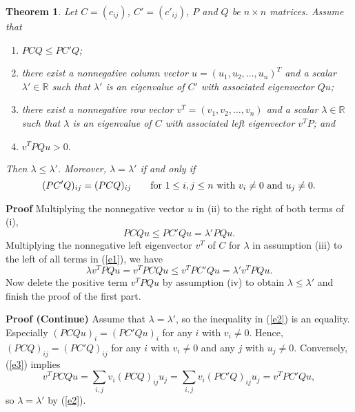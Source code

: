 \documentclass{article}
\theoremstyle{plain}
\newtheorem{thm}{Theorem}[section]
\theoremstyle{definition}
\begin{document}
\begin{thm}
 Let $C=(c_{ij})$, $C'=(c'_{ij})$, $P$ and $Q$ be  $n\times n$ matrices.
Assume that
\begin{enumerate}
\item[(i)]    $PCQ\leq PC'Q$;
\item[(ii)]  there exist a nonnegative column vector $u=(u_1, u_2, \ldots, u_n)^T$  and a scalar $\lambda'\in \mathbb{R}$ such that $\lambda'$ is an eigenvalue of $C'$ with associated eigenvector $Qu$;
\item[(iii)] there exist a nonnegative row vector $v^T=(v_1, v_2, \ldots, v_n)$  and a scalar $\lambda\in \mathbb{R}$
such that $\lambda$ is an eigenvalue of $C$ with associated  left eigenvector $v^TP$; and
\item[(iv)] $v^TPQu>0.$
\end{enumerate}
 Then $\lambda\leq \lambda'$.
    Moreover, $\lambda=\lambda'$ 
if and only if
    \begin{equation*}
        \label{e3}
(PC'Q)_{ij}=(PCQ)_{ij}\qquad \hbox{for~}1\leq i, j\leq n \hbox{~with~} v_i\ne 0 \hbox{~and~} u_j\ne 0.
\end{equation*}
\end{thm}


{\bf Proof}
            Multiplying the nonnegative vector $u$ in (ii) to the right of both terms of  (i),
        \begin{equation}
            \label{e1}
            PCQu\leq PC'Qu=\lambda'PQu.
        \end{equation}
        Multiplying the nonnegative left eigenvector $v^T$ of $C$ for $\lambda$ in assumption (iii) to the left of all terms  in (\ref{e1}), we have
        \begin{equation}
            \label{e2}
            \lambda v^TPQu=v^TPCQu\leq v^TPC'Qu=\lambda' v^TPQu.
        \end{equation}
        Now delete the positive term $v^TPQu$ by assumption (iv) to obtain $\lambda\leq \lambda'$ and finish the proof of the first part.


{\bf Proof (Continue)}
        Assume that $\lambda=\lambda'$, so the inequality in (\ref{e2}) is an equality.  Especially $(PCQu)_i=(PC'Qu)_i$ for any $i$ with $v_i\not=0.$ Hence, $(PCQ)_{ij}=(PC'Q)_{ij}$ for any $i$ with $v_i\not=0$ and any $j$ with $u_j\not=0.$
         Conversely, (\ref{e3}) implies $$v^TPCQu=\sum_{i,j} v_i(PCQ)_{ij}u_j=\sum_{i,j} v_i(PC'Q)_{ij}u_j=v^TPC'Qu,$$ so
            $\lambda=\lambda'$ by (\ref{e2}).
\end{document}
